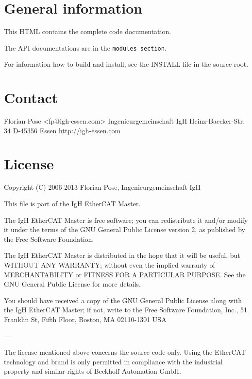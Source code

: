 \section{General information}\label{index_sec_general}
This H\-T\-M\-L contains the complete code documentation.

The A\-P\-I documentations are in the {\tt modules section}.

For information how to build and install, see the I\-N\-S\-T\-A\-L\-L file in the source root.\section{Contact}\label{index_sec_contact}
\begin{DoxyVerb}Florian Pose <fp@igh-essen.com>
Ingenieurgemeinschaft IgH
Heinz-Baecker-Str. 34
D-45356 Essen
http://igh-essen.com
\end{DoxyVerb}
\section{License}\label{index_sec_license}
\begin{DoxyVerb}Copyright (C) 2006-2013  Florian Pose, Ingenieurgemeinschaft IgH

This file is part of the IgH EtherCAT Master.

The IgH EtherCAT Master is free software; you can redistribute it and/or
modify it under the terms of the GNU General Public License version 2, as
published by the Free Software Foundation.

The IgH EtherCAT Master is distributed in the hope that it will be useful,
but WITHOUT ANY WARRANTY; without even the implied warranty of
MERCHANTABILITY or FITNESS FOR A PARTICULAR PURPOSE.  See the GNU General
Public License for more details.

You should have received a copy of the GNU General Public License along
with the IgH EtherCAT Master; if not, write to the Free Software
Foundation, Inc., 51 Franklin St, Fifth Floor, Boston, MA  02110-1301  USA

---

The license mentioned above concerns the source code only. Using the
EtherCAT technology and brand is only permitted in compliance with the
industrial property and similar rights of Beckhoff Automation GmbH.
\end{DoxyVerb}
 